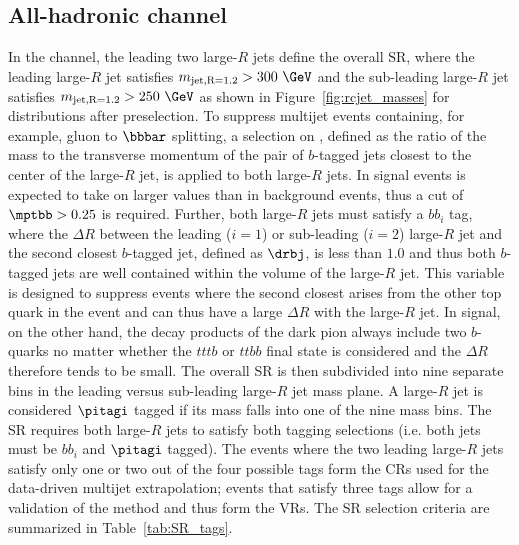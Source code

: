 \subsection{All-hadronic channel}
\label{sec:evtsel_allhad}
In the \allhad channel, the leading two large-$R$ jets define the overall SR, where the leading large-$R$ jet satisfies $m_{\text{jet,R=1.2}}>300~\GeV$ and the sub-leading large-$R$ jet satisfies $m_{\text{jet,R=1.2}}>250~\GeV$ as shown in Figure~\ref{fig:rcjet_masses} for distributions after preselection. To suppress multijet events containing, for example, gluon to $\bbbar$ splitting, a selection on \mptbb, defined as the ratio of the mass to the transverse momentum of the pair of $b$-tagged jets closest to the center of the large-$R$ jet, is applied to both large-$R$ jets. In signal events \mptbb is expected to take on larger values than in background events, thus a cut of $\mptbb > 0.25$ is required. Further, both large-$R$ jets must satisfy a $bb_i$ tag, where the $\Delta R$ between the leading ($i=1$) or sub-leading ($i=2$) large-$R$ jet and the second closest $b$-tagged jet, defined as $\drbj$, is less than $1.0$ and thus both $b$-tagged jets are well contained within the volume of the large-$R$ jet. This variable is designed to suppress \ttbar events where the second closest \bjet arises from the other top quark in the event and can thus have a large $\Delta R$ with the large-$R$ jet. In signal, on the other hand, the decay products of the dark pion always include two $b$-quarks no matter whether the $tttb$ or $ttbb$ final state is considered and the $\Delta R$ therefore tends to be small. The overall SR is then subdivided into nine separate bins in the leading versus sub-leading large-$R$ jet mass plane. 
A large-$R$ jet is considered $\pitagi$ tagged if its mass falls into one of the nine mass bins. The SR requires both large-$R$ jets to satisfy both tagging selections (i.e. both jets must be $bb_i$ and $\pitagi$ tagged). The events where the two leading large-$R$ jets satisfy only one or two out of the four possible tags form the CRs used for the data-driven multijet extrapolation; events that satisfy three tags allow for a validation of the method and thus form the VRs. The SR selection criteria are summarized in Table~\ref{tab:SR_tags}.
 
